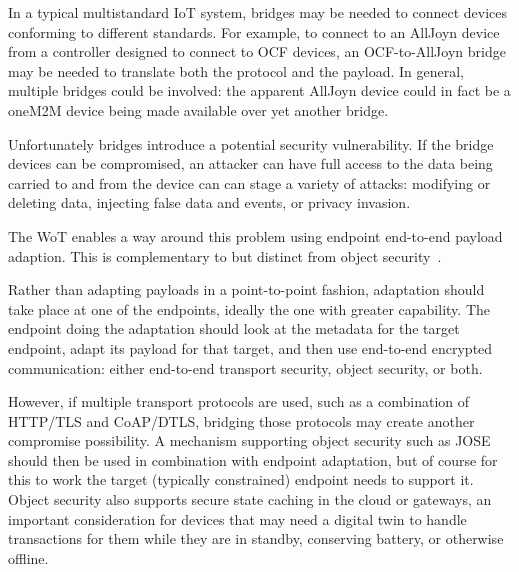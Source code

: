In a typical multistandard IoT system,
bridges may be needed to connect devices
conforming to different standards.
For example,
to connect to an AllJoyn device from a controller
designed to connect to OCF devices, an OCF-to-AllJoyn bridge
may be needed to translate both the protocol and the payload.
In general, multiple bridges could be involved: the
apparent AllJoyn device could in fact be a oneM2M device
being made available over yet another bridge.

Unfortunately bridges introduce a potential security vulnerability.
If the bridge devices can be compromised,
an attacker can have full access to the
data being carried to and from the device can can stage a 
variety of attacks: 
modifying or deleting data,
injecting false data and events,
or privacy invasion.

The WoT enables a way around this problem using endpoint 
end-to-end payload adaption.
This is complementary to but distinct from object security~\cite{Mattsson2014}.

Rather than adapting payloads in a point-to-point fashion,
adaptation should take place at one of the endpoints, ideally the
one with greater capability.  The endpoint doing the adaptation should
look at the metadata for the target endpoint, adapt its payload for that
target, and then use end-to-end encrypted communication:
either end-to-end transport security, object security, or both.

However, if multiple transport protocols are used, such as a 
combination of HTTP/TLS and CoAP/DTLS, bridging those protocols
may create another compromise possibility.  A mechanism supporting
object security such as JOSE~\cite{Jose2014} should then be used
in combination with endpoint adaptation, but of course for this to
work the target (typically constrained) endpoint needs to support it. 
Object security also supports secure state caching in the cloud or gateways,
an important consideration for devices that may need a digital
twin to handle transactions for them while they are in standby,
conserving battery, or otherwise offline.


